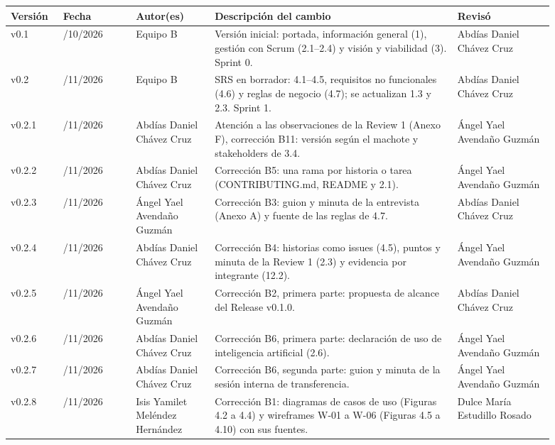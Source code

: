 {\small
\begin{longtable}[]{@{}
  >{\raggedright\arraybackslash}p{0.08\linewidth}
  >{\raggedright\arraybackslash}p{0.12\linewidth}
  >{\raggedright\arraybackslash}p{0.13\linewidth}
  >{\raggedright\arraybackslash}p{0.40\linewidth}
  >{\raggedright\arraybackslash}p{0.16\linewidth}@{}}
\toprule
\textbf{Versión} & \textbf{Fecha} & \textbf{Autor(es)} & \textbf{Descripción del cambio} & \textbf{Revisó} \\
\midrule
v0.1 & 29/10/2026 & Equipo B & Versión inicial: portada, información general (1), gestión con Scrum (2.1--2.4) y visión y viabilidad (3). Sprint 0. & Abdías Daniel Chávez Cruz \\
v0.2 & 11/11/2026 & Equipo B & SRS en borrador: 4.1--4.5, requisitos no funcionales (4.6) y reglas de negocio (4.7); se actualizan 1.3 y 2.3. Sprint 1. & Abdías Daniel Chávez Cruz \\
v0.2.1 & 11/11/2026 & Abdías Daniel Chávez Cruz & Atención a las observaciones de la Review 1 (Anexo F), corrección B11: versión según el machote y stakeholders de 3.4. & Ángel Yael Avendaño Guzmán \\
v0.2.2 & 11/11/2026 & Abdías Daniel Chávez Cruz & Corrección B5: una rama por historia o tarea (CONTRIBUTING.md, README y 2.1). & Ángel Yael Avendaño Guzmán \\
v0.2.3 & 12/11/2026 & Ángel Yael Avendaño Guzmán & Corrección B3: guion y minuta de la entrevista (Anexo A) y fuente de las reglas de 4.7. & Abdías Daniel Chávez Cruz \\
v0.2.4 & 12/11/2026 & Abdías Daniel Chávez Cruz & Corrección B4: historias como issues (4.5), puntos y minuta de la Review 1 (2.3) y evidencia por integrante (12.2). & Ángel Yael Avendaño Guzmán \\
v0.2.5 & 12/11/2026 & Ángel Yael Avendaño Guzmán & Corrección B2, primera parte: propuesta de alcance del Release v0.1.0. & Abdías Daniel Chávez Cruz \\
v0.2.6 & 12/11/2026 & Abdías Daniel Chávez Cruz & Corrección B6, primera parte: declaración de uso de inteligencia artificial (2.6). & Ángel Yael Avendaño Guzmán \\
v0.2.7 & 18/11/2026 & Abdías Daniel Chávez Cruz & Corrección B6, segunda parte: guion y minuta de la sesión interna de transferencia. & Ángel Yael Avendaño Guzmán \\
v0.2.8 & 18/11/2026 & Isis Yamilet Meléndez Hernández & Corrección B1: diagramas de casos de uso (Figuras 4.2 a 4.4) y wireframes W-01 a W-06 (Figuras 4.5 a 4.10) con sus fuentes. & Dulce María Estudillo Rosado \\

\end{longtable}}

